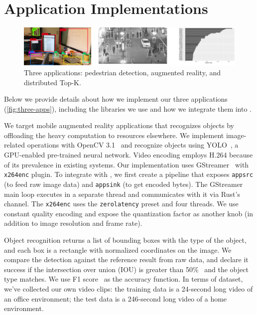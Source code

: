\section{Application Implementations}
\label{appendix:appl-impl}

\begin{figure}
  \centering
  \includegraphics[width=\columnwidth]{figures/apps.pdf}
  \caption{Three applications: pedestrian detection, augmented reality, and
    distributed Top-K.}
  \label{fig:three-apps}
\end{figure}

Below we provide details about how we implement our three applications
(\autoref{fig:three-apps}), including the libraries we use and how we integrate
them into \sysname{}.

 We target mobile augmented reality applications that
recognizes objects by offloading the heavy computation to resources elsewhere.
We implement image-related operations with OpenCV 3.1~\cite{opencvlibrary} and
recognize objects using YOLO~\cite{darknet13, redmon2016yolo9000}, a GPU-enabled
pre-trained neural network. Video encoding employs H.264 because of its
prevalence in existing systems. Our implementation uses
GStreamer~\cite{gstreamer} with \texttt{x264enc} plugin. To integrate with
\sysname{}, we first create a pipeline that exposes \texttt{appsrc} (to feed raw
image data) and \texttt{appsink} (to get encoded bytes). The GStreamer main loop
executes in a separate thread and \sysname{} communicates with it via Rust's
channel. The \texttt{x264enc} uses the \texttt{zerolatency} preset and four
threads. We use constant quality encoding and expose the quantization factor as
another knob (in addition to image resolution and frame rate).

Object recognition returns a list of bounding boxes with the type of the object,
and each box is a rectangle with normalized coordinates on the image. We compare
the detection against the reference result from raw data, and declare it success
if the intersection over union (IOU) is greater than
50\%~\cite{everingham2010pascal} and the object type matches. We use F1
score~\cite{Rijsbergen:1979:IR:539927} as the accuracy function. In terms of
dataset, we've collected our own video clips: the training data is a 24-second
long video of an office environment; the test data is a 246-second long video of
a home environment.


